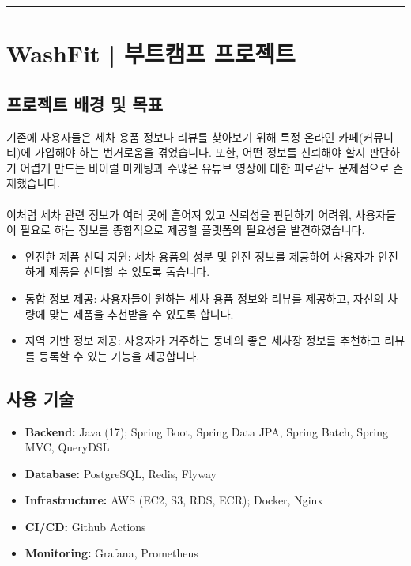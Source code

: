 \documentclass[12pt,a4paper]{article}
\newcommand{\thickdivider}{%
    \vspace{0.5cm}%
    \begin{center}%
    \textcolor{gray}{\rule{0.3\textwidth}{1pt}}%
    \end{center}%
}
\begin{document}
    \thickdivider



    \section{WashFit | 부트캠프 프로젝트}

    \subsection{프로젝트 배경 및 목표}

    기존에 사용자들은 세차 용품 정보나 리뷰를 찾아보기 위해 특정 온라인 카페(커뮤니티)에 가입해야 하는 번거로움을 겪었습니다. 또한, 어떤 정보를 신뢰해야 할지 판단하기 어렵게 만드는 바이럴 마케팅과 수많은 유튜브 영상에 대한 피로감도 문제점으로 존재했습니다. \\ \\ 이처럼 세차 관련 정보가 여러 곳에 흩어져 있고 신뢰성을 판단하기 어려워, 사용자들이 필요로 하는 정보를 종합적으로 제공할 플랫폼의 필요성을 발견하였습니다. \\

    \begin{itemize}
        \item 안전한 제품 선택 지원: 세차 용품의 성분 및 안전 정보를 제공하여 사용자가 안전하게 제품을 선택할 수 있도록 돕습니다.
        \item 통합 정보 제공: 사용자들이 원하는 세차 용품 정보와 리뷰를 제공하고, 자신의 차량에 맞는 제품을 추천받을 수 있도록 합니다.
        \item 지역 기반 정보 제공: 사용자가 거주하는 동네의 좋은 세차장 정보를 추천하고 리뷰를 등록할 수 있는 기능을 제공합니다.
    \end{itemize}
    \subsection{사용 기술}

    \begin{itemize}
        \item \textbf{Backend:} Java (17); Spring Boot, Spring Data JPA, Spring Batch, Spring MVC, QueryDSL
        \item \textbf{Database:} PostgreSQL, Redis, Flyway
        \item \textbf{Infrastructure:} AWS (EC2, S3, RDS, ECR); Docker, Nginx
        \item \textbf{CI/CD:} Github Actions
        \item \textbf{Monitoring:} Grafana, Prometheus
    \end{itemize}
\end{document}
